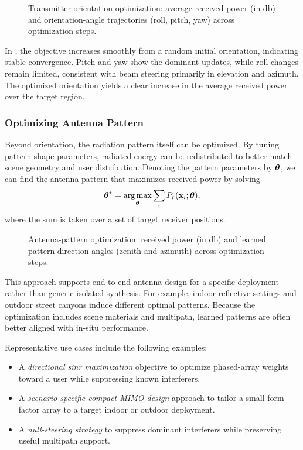 \begin{figure}
  \centering
  \caption{Transmitter-orientation optimization: average received power (in \unit{\decibel}) and orientation-angle trajectories (roll, pitch, yaw) across optimization steps.}
\end{figure}

In , the objective increases smoothly from a random initial orientation, indicating stable convergence. Pitch and yaw show the dominant updates, while roll changes remain limited, consistent with beam steering primarily in elevation and azimuth. The optimized orientation yields a clear increase in the average received power over the target region.

\subsubsection{Optimizing Antenna Pattern}

Beyond orientation, the radiation pattern itself can be optimized. By tuning pattern-shape parameters, radiated energy can be redistributed to better match scene geometry and user distribution. Denoting the pattern parameters by $\boldsymbol{\theta}$, we can find the antenna pattern that maximizes received power by solving
\begin{equation}
  \boldsymbol{\theta}^{\star}
  = \operatorname*{arg\,max}_{\boldsymbol{\theta}} \sum_i P_r(\mathbf{x}_i; \boldsymbol{\theta}),
\end{equation}
where the sum is taken over a set of target receiver positions.

\begin{figure}
  \centering
  \caption{Antenna-pattern optimization: received power (in \unit{\decibel}) and learned pattern-direction angles (zenith and azimuth) across optimization steps.}
\end{figure}

This approach supports end-to-end antenna design for a specific deployment rather than generic isolated synthesis. For example, indoor reflective settings and outdoor street canyons induce different optimal patterns. Because the optimization includes scene materials and multipath, learned patterns are often better aligned with in-situ performance.

Representative use cases include the following examples:
\begin{itemize}
  \item A \emph{directional \gls{sinr} maximization} objective to optimize phased-array weights toward a user while suppressing known interferers.
  \item A \emph{scenario-specific compact MIMO design} approach to tailor a small-form-factor array to a target indoor or outdoor deployment.
  \item A \emph{null-steering strategy} to suppress dominant interferers while preserving useful multipath support.
\end{itemize}

